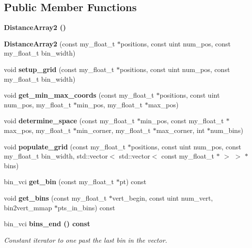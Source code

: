 \subsection*{Public Member Functions}
\begin{CompactItemize}
\item 
\bf{Distance\-Array2} ()
\item 
\textbf{Distance\-Array2} (const my\_\-float\_\-t $\ast$positions, const uint num\_\-pos, const my\_\-float\_\-t bin\_\-width)\label{classSimSite3D_1_1geometry_1_1DistanceArray2_49275693a93f9cebda96761d3a2915b5}

\item 
void \textbf{setup\_\-grid} (const my\_\-float\_\-t $\ast$positions, const uint num\_\-pos, const my\_\-float\_\-t bin\_\-width)\label{classSimSite3D_1_1geometry_1_1DistanceArray2_23d27799b8d0236ec7c24c9997922a99}

\item 
void \textbf{get\_\-min\_\-max\_\-coords} (const my\_\-float\_\-t $\ast$positions, const uint num\_\-pos, my\_\-float\_\-t $\ast$min\_\-pos, my\_\-float\_\-t $\ast$max\_\-pos)\label{classSimSite3D_1_1geometry_1_1DistanceArray2_9bc747ee3e49df4d6ffebb44894e7fc2}

\item 
void \textbf{determine\_\-space} (const my\_\-float\_\-t $\ast$min\_\-pos, const my\_\-float\_\-t $\ast$max\_\-pos, my\_\-float\_\-t $\ast$min\_\-corner, my\_\-float\_\-t $\ast$max\_\-corner, int $\ast$num\_\-bins)\label{classSimSite3D_1_1geometry_1_1DistanceArray2_d44944a03efc076969d8ab6b9973606c}

\item 
void \textbf{populate\_\-grid} (const my\_\-float\_\-t $\ast$positions, const uint num\_\-pos, const my\_\-float\_\-t bin\_\-width, std::vector$<$ std::vector$<$ const my\_\-float\_\-t $\ast$ $>$ $>$ $\ast$bins)\label{classSimSite3D_1_1geometry_1_1DistanceArray2_c518041203193931e8be215e65d2b5a1}

\item 
bin\_\-vci \textbf{get\_\-bin} (const my\_\-float\_\-t $\ast$pt) const \label{classSimSite3D_1_1geometry_1_1DistanceArray2_fe1645f8f07c30ac363eb665e0c3c365}

\item 
void \textbf{get\_\-bins} (const my\_\-float\_\-t $\ast$vert\_\-begin, const uint num\_\-vert, bin2vert\_\-mmap $\ast$pts\_\-in\_\-bins) const \label{classSimSite3D_1_1geometry_1_1DistanceArray2_dd5739ac76526d894efa53e17461a20b}

\item 
bin\_\-vci \bf{bins\_\-end} () const \label{classSimSite3D_1_1geometry_1_1DistanceArray2_cf50a867e282cb26de29625843288be7}

\begin{CompactList}\small\item\em Constant iterator to one past the last bin in the vector. \item\end{CompactList}\end{CompactItemize}
